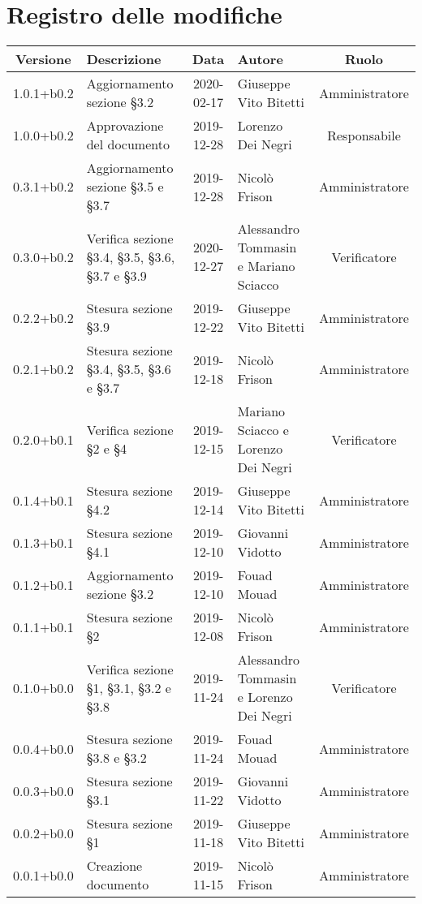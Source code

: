 \section*{Registro delle modifiche}

\begin{center}
	\begin{longtable}{|c|p{3cm}|c|p{4cm}|c|}
	\hline
	\rowcolor{lighter-grayer}
	\textbf{Versione} & \textbf{Descrizione} & \textbf{Data} & \textbf{Autore} & \textbf{Ruolo} \\
	\hline
	\endfirsthead



	1.0.1+b0.2 & Aggiornamento sezione \S3.2 & 2020-02-17 & Giuseppe Vito Bitetti & Amministratore \\
	\hline
	1.0.0+b0.2 & Approvazione del documento & 2019-12-28 & Lorenzo Dei Negri & Responsabile \\
	\hline
	0.3.1+b0.2 & Aggiornamento sezione  \S3.5 e \S3.7 & 2019-12-28 & Nicolò Frison & Amministratore \\
	\hline
	0.3.0+b0.2 & Verifica sezione \S3.4, \S3.5, \S3.6, \S3.7 e \S3.9 & 2020-12-27 & Alessandro Tommasin e Mariano Sciacco & Verificatore\\
	\hline
	0.2.2+b0.2 & Stesura sezione \S3.9 & 2019-12-22 & Giuseppe Vito Bitetti & Amministratore \\
	\hline
	0.2.1+b0.2 & Stesura sezione \S3.4, \S3.5, \S3.6 e \S3.7 & 2019-12-18 & Nicolò Frison & Amministratore \\
	\hline
	0.2.0+b0.1 & Verifica sezione \S2 e \S4 & 2019-12-15 & Mariano Sciacco e Lorenzo Dei Negri & Verificatore \\
	\hline
	0.1.4+b0.1 & Stesura sezione \S4.2 & 2019-12-14 & Giuseppe Vito Bitetti & Amministratore \\
	\hline
	0.1.3+b0.1 & Stesura sezione \S4.1 & 2019-12-10 & Giovanni Vidotto & Amministratore \\
	\hline
	0.1.2+b0.1 & Aggiornamento sezione \S3.2 & 2019-12-10 & Fouad Mouad & Amministratore \\
	\hline
	0.1.1+b0.1 & Stesura sezione \S2  & 2019-12-08 & Nicolò Frison & Amministratore \\
	\hline
	0.1.0+b0.0 & Verifica sezione \S1, \S3.1, \S3.2 e \S3.8 & 2019-11-24 & Alessandro Tommasin e Lorenzo Dei Negri & Verificatore \\
	\hline
	0.0.4+b0.0 & Stesura sezione \S3.8 e \S3.2 & 2019-11-24 & Fouad Mouad & Amministratore \\
	\hline
	0.0.3+b0.0 & Stesura sezione \S3.1 & 2019-11-22 & Giovanni Vidotto & Amministratore \\
	\hline
	0.0.2+b0.0 & Stesura sezione \S1 & 2019-11-18 & Giuseppe Vito Bitetti & Amministratore \\
	\hline
	0.0.1+b0.0 & Creazione documento & 2019-11-15 & Nicolò Frison & Amministratore  \\
	\hline

	\end{longtable}
\end{center}
